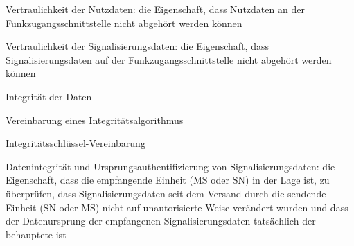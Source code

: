 \documentclass[a4paper]{article}
\begin{document}
\begin{multicols}{3}
\begin{itemize*}
\begin{itemize*}
                  \item Vertraulichkeit der Nutzdaten: die Eigenschaft, dass Nutzdaten an der Funkzugangsschnittstelle nicht abgehört werden können
                  \item Vertraulichkeit der Signalisierungsdaten: die Eigenschaft, dass Signalisierungsdaten auf der Funkzugangsschnittstelle nicht abgehört werden können
            \end{itemize*}
            \item Integrität der Daten
            \begin{itemize*}
                  \item Vereinbarung eines Integritätsalgorithmus
                  \item Integritätsschlüssel-Vereinbarung
                  \item Datenintegrität und Ursprungsauthentifizierung von Signalisierungsdaten: die Eigenschaft, dass die empfangende Einheit (MS oder SN) in der Lage ist, zu überprüfen, dass Signalisierungsdaten seit dem Versand durch die sendende Einheit (SN oder MS) nicht auf unautorisierte Weise verändert wurden und dass der Datenursprung der empfangenen Signalisierungsdaten tatsächlich der behauptete ist
            \end{itemize*}
      \end{itemize*}




\end{multicols}
\end{document}
